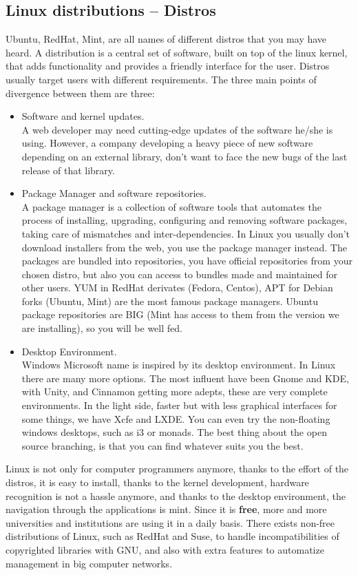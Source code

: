 \documentclass[a4paper]{article}
\begin{document}
\subsection{Linux distributions -- Distros}
Ubuntu, RedHat, Mint, are all names of different distros that you may have heard. A distribution is a central set of software, built on top of the linux kernel, that adds functionality and provides a friendly interface for the user. 
Distros usually target users with different requirements. The three main points of divergence between them are three:
\begin{itemize}
    \item Software and kernel updates.\\ A web developer may need cutting-edge updates of the software he/she is using. However, a company developing a heavy piece of new software depending on an external library, don't want to face the new bugs of the last release of that library.
    \item Package Manager and software repositories.\\ A package manager is a collection of software tools that automates the process of installing, upgrading, configuring and removing software packages, taking care of mismatches and inter-dependencies. In Linux you usually don't download installers from the web, you use the package manager instead. The packages are bundled into repositories, you have official repositories from your chosen distro, but also you can access to bundles made and maintained for other users. YUM in RedHat derivates (Fedora, Centos), APT for Debian forks (Ubuntu, Mint) are the most famous package managers. Ubuntu package repositories are BIG (Mint has access to them from the version we are installing), so you will be well fed. 
    \item Desktop Environment.\\ Windows Microsoft name is inspired by its desktop environment. In Linux there are many more options. The most influent have been Gnome and KDE, with Unity, and Cinnamon getting more adepts, these are very complete environments. In the light side, faster but with less graphical interfaces for some things, we have Xcfe and LXDE. You can even try the non-floating windows desktops, such as i3 or monads. The best thing about the open source branching, is that you can find whatever suits you the best.
\end{itemize}

Linux is not only for computer programmers anymore, thanks to the effort of the distros, it is easy to install, thanks to the kernel development, hardware recognition is not a hassle anymore, and thanks to the desktop environment, the navigation through the applications is mint. Since it is \textbf{free}, more and more universities and institutions are using it in a daily basis. There exists non-free distributions of Linux, such as RedHat and Suse, to handle incompatibilities of copyrighted libraries with GNU, and also with extra features to automatize management in big computer networks.\\
\end{document}
